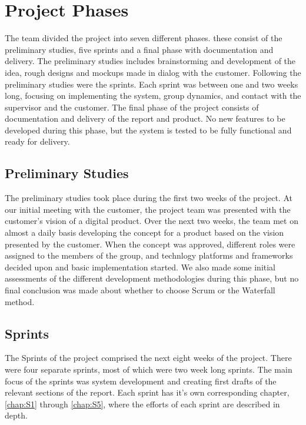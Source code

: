 \section{Project Phases}
\label{sec:PlanningProjPhases}
The team divided the project into seven different phases. these consist of the preliminary studies, five sprints and a final phase with documentation and delivery. The preliminary studies includes brainstorming and development of the idea, rough designs and mockups made in dialog with the customer. Following the preliminary studies were the sprints. Each sprint was between one and two weeks long, focusing on implementing the system, group dynamics, and contact with the supervisor and the customer. The final phase of the project consists of documentation and delivery of the report and product. No new features to be developed during this phase, but the system is tested to be fully functional and ready for delivery.

\subsection{Preliminary Studies}
\label{subsec:PlanningProjPhasesPrelim}
The preliminary studies took place during the first two weeks of the project. At our initial meeting with the customer, the project team was presented with the customer's vision of a digital product. Over the next two weeks, the team met on almost a daily basis developing the concept for a product based on the vision presented by the customer. When the concept was approved, different roles were assigned to the members of the group, and technlogy platforms and frameworks decided upon and basic implementation started. We also made some initial assessments of the different development methodologies during this phase, but no final conclusion was made about whether to choose Scrum or the Waterfall method.

\subsection{Sprints}
\label{subsec:PlanningProjPhasesSprints}
The Sprints of the project comprised the next eight weeks of the project. There were four separate sprints, most of which were two week long sprints. The main focus of the sprints was system development and creating first drafts of the relevant sections of the report. Each sprint has it's own corresponding chapter, \ref{chap:S1} through \ref{chap:S5}, where the efforts of each sprint are described in depth.

